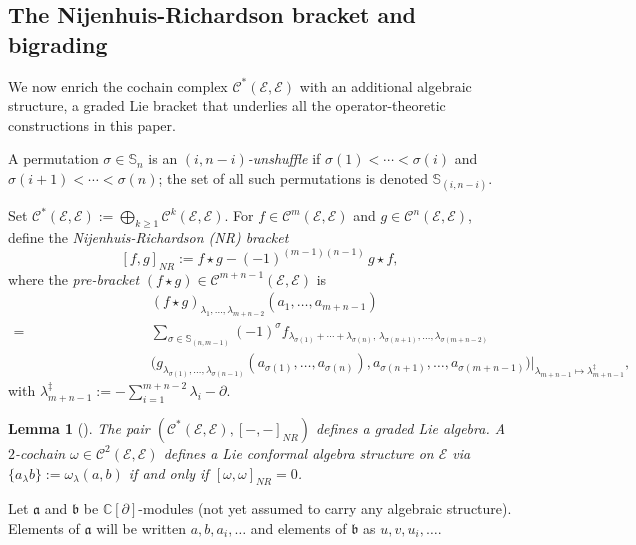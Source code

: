 \documentclass[a4paper,11pt]{article}
\def\Rg{\mathbb{C}[\partial]}
\def\Ep{\mathcal{E}}
\def\Vs{\mathfrak{a}}
\def\Ws{\mathfrak{b}}
\def\Cch{\mathscr{C}}
\def\la{\lambda}
\def\perm{\mathbb{S}}
\numberwithin{equation}{section}
\newtheorem{lemma}[theorem]{Lemma}
\begin{document}
\subsection{The Nijenhuis-Richardson bracket and bigrading}
\label{subsec:FN}

We now enrich the cochain complex $\Cch^*(\Ep,\Ep)$ with an additional
algebraic structure,  a graded Lie bracket  that underlies all the
operator-theoretic constructions in this paper.

A permutation $\sigma\in\perm_n$ is an \textit{$(i,n-i)$-unshuffle}
if $\sigma(1)<\cdots<\sigma(i)$ and $\sigma(i+1)<\cdots<\sigma(n)$; the
set of all such permutations is denoted $\perm_{(i,n-i)}$.

Set $\Cch^*(\Ep,\Ep) := \bigoplus_{k\geq1}\Cch^k(\Ep,\Ep)$.  For
$f\in\Cch^m(\Ep,\Ep)$ and $g\in\Cch^n(\Ep,\Ep)$, define the
\textit{Nijenhuis-Richardson 
(NR) bracket}
\begin{equation}\label{eq:FN-bracket}
  [f,g]_{NR} := f \star g - (-1)^{(m-1)(n-1)}\,g\star f,
\end{equation}
where the \emph{pre-bracket} $(f\star g)\in\Cch^{m+n-1}(\Ep,\Ep)$ is
\begin{align*}
  &(f\star g)_{\la_1,\ldots,\la_{m+n-2}}(a_1,\ldots,a_{m+n-1}) \\
  =&  \sum_{\sigma\in\perm_{(n,m-1)}}(-1)^\sigma
    f_{\la_{\sigma(1)}+\cdots+\la_{\sigma(n)},\,
       \la_{\sigma(n+1)},\ldots,\la_{\sigma(m+n-2)}}\\\quad\quad\quad\quad\quad\quad\quad\quad\quad&
    \bigl(g_{\la_{\sigma(1)},\ldots,\la_{\sigma(n-1)}}
          (a_{\sigma(1)},\ldots,a_{\sigma(n)}),
    a_{\sigma(n+1)},\ldots,a_{\sigma(m+n-1)}\bigr)
    \big|_{\la_{m+n-1}\mapsto\la_{m+n-1}^\ddag},
\end{align*}
with $\la_{m+n-1}^\ddag := -\sum_{i=1}^{m+n-2}\la_i - \partial$.

\begin{lemma}[{\cite{DK13}}]\label{lem:FN-gLa}
 The pair  $(\Cch^*(\Ep,\Ep),[-,-]_{NR})$ defines a graded Lie algebra.  A $2$-cochain
  $\omega\in\Cch^2(\Ep,\Ep)$ defines a Lie conformal  algebra structure
  on $\Ep$ via $\{a_\lambda b\}:=\omega_\lambda(a,b)$ if and only if
  $[\omega,\omega]_{NR} = 0$.
\end{lemma}


Let $\Vs$ and $\Ws$ be $\Rg$-modules (not yet assumed to carry any
algebraic structure). Elements of $\Vs$ will be written $a,b,a_i,\ldots$
and elements of $\Ws$ as $u,v,u_i,\ldots$.
\end{document}
